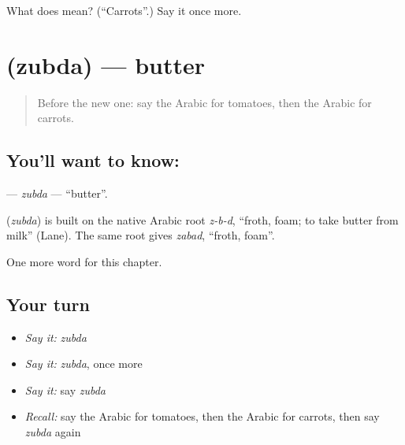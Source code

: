 \begin{tcolorbox}[breakable,colback=teal!4,colframe=teal!35!black,title={Before you move on}]
What does  mean? (\textquotedblleft{}Carrots\textquotedblright{}.) Say it once more.
\end{tcolorbox}
\section[\texorpdfstring{\ar{زبدة} (zubda)}{زبدة (zubda)}]{ (zubda) — butter}

\label{lesson:AR-C67-zubda}



\begin{quote}
Before the new one: say the Arabic for tomatoes, then the Arabic for carrots.
\end{quote}

\subsection*{You'll want to know: }
\textbf{} — \emph{zubda} — \textquotedblleft{}butter\textquotedblright{}.

\begin{cousinweb}
\textbf{} (\emph{zubda}) is built on the native Arabic root \emph{z-b-d}, \textquotedblleft{}froth, foam; to take butter from milk\textquotedblright{} (Lane). The same root gives \emph{zabad}, \textquotedblleft{}froth, foam\textquotedblright{}.
\end{cousinweb}

\begin{grammarlens}[title={What you've built}]
One more word for this chapter.
\end{grammarlens}

\subsection*{Your turn}
\begin{itemize}
\raggedright
  \item \emph{Say it:} \emph{zubda}
  \item \emph{Say it:} \emph{zubda}, once more
  \item \emph{Say it:} say \emph{zubda}
  \item \emph{Recall:} say the Arabic for tomatoes, then the Arabic for carrots, then say \emph{zubda} again
\end{itemize}

